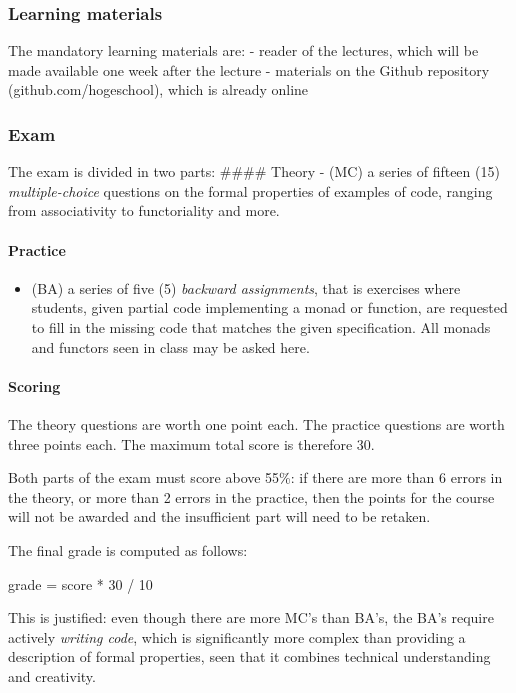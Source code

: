 \documentclass{article}
\begin{document}
\subsubsection{Learning materials}\label{learning-materials}

The mandatory learning materials are: - reader of the lectures, which
will be made available one week after the lecture - materials on the
Github repository (github.com/hogeschool), which is already online

    \subsubsection{Exam}\label{exam}

The exam is divided in two parts: \#\#\#\# Theory - (MC) a series of
fifteen (15) \emph{multiple-choice} questions on the formal properties
of examples of code, ranging from associativity to functoriality and
more.

\paragraph{Practice}\label{practice}

\begin{itemize}[noitemsep]
\item
  (BA) a series of five (5) \emph{backward assignments}, that is
  exercises where students, given partial code implementing a monad or
  function, are requested to fill in the missing code that matches the
  given specification. All monads and functors seen in class may be
  asked here.
\end{itemize}

\paragraph{Scoring}\label{scoring}

The theory questions are worth one point each. The practice questions
are worth three points each. The maximum total score is therefore 30.

Both parts of the exam must score above 55\%: if there are more than 6
errors in the theory, or more than 2 errors in the practice, then the
points for the course will not be awarded and the insufficient part will
need to be retaken.

The final grade is computed as follows:

grade = score * 30 / 10

This is justified: even though there are more MC's than BA's, the BA's
require actively \emph{writing code}, which is significantly more
complex than providing a description of formal properties, seen that it
combines technical understanding and creativity.
\end{document}
